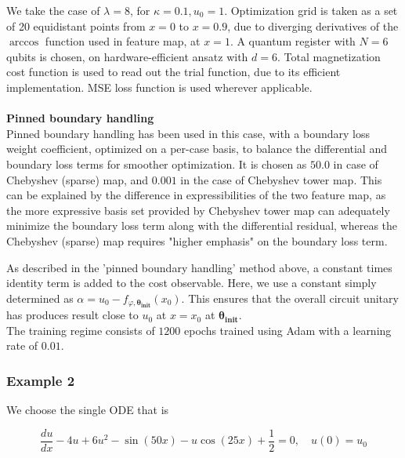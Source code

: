 \documentclass[11pt,a4paper]{article}
\begin{document}
{We take the case of $\lambda = 8$, for $\kappa = 0.1, u_0 = 1$. Optimization grid is taken as a set of 20 equidistant points from $x = 0$ to $x = 0.9$, due to diverging derivatives of the $\arccos$ function used in feature map, at $x = 1$. A quantum register with $N = 6$ qubits is chosen, on hardware-efficient ansatz with $d = 6$. Total magnetization cost function is used to read out the trial function, due to its efficient implementation. MSE loss function is used wherever applicable.
\\\\
\textbf{Pinned boundary handling}\\
Pinned boundary handling has been used in this case, with a boundary loss weight coefficient, optimized on a per-case basis, to balance the differential and boundary loss terms for smoother optimization. It is chosen as $50.0$ in case of Chebyshev (sparse) map, and $0.001$ in the case of Chebyshev tower map. This can be explained by the difference in expressibilities of the two feature map, as the more expressive basis set provided by Chebyshev tower map  can adequately minimize the boundary loss term along with the differential residual, whereas the Chebyshev (sparse) map requires "higher emphasis" on the boundary loss term.

As described in the 'pinned boundary handling' method above, a constant times identity term is added to the cost observable. Here, we use a constant simply determined as $\alpha = u_0 - f_{\varphi, \boldsymbol{\theta_\text{init}}}(x_0)$. This ensures that the overall circuit unitary has produces result close to $u_0$ at $x = x_0$ at $\boldsymbol{\theta_\text{init}}$.
\\
The training regime consists of $1200$ epochs trained using Adam with a learning rate of $0.01$.

\subsubsection{Example 2}
We choose the single ODE that is

\begin{equation} \label{eq:second}
    \frac{du}{dx} - 4u + 6u^2 - \sin(50x) - u\cos(25x) + \frac{1}{2} = 0, \quad u(0) = u_0
\end{equation}

}
\end{document}
